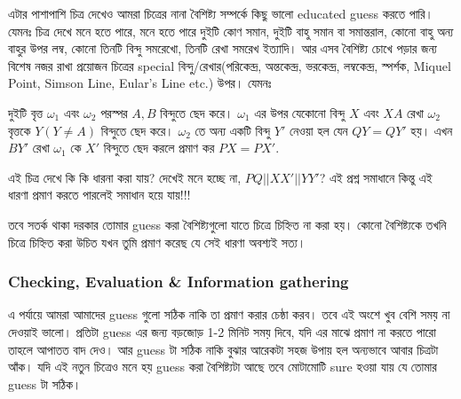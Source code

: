 \documentclass[a4paper,11pt]{article}
\begin{document}
এটার পাশাপাশি চিত্র দেখেও আমরা চিত্রের নানা বৈশিষ্ট্য সম্পর্কে কিছু ভালো educated guess করতে পারি। যেমনঃ  চিত্র দেখে মনে হতে পারে, মনে হতে পারে দুইটি কোণ সমান, দুইটি বাহু সমান বা সমান্তরাল, কোনো বাহু অন্য বাহুর উপর লম্ব, কোনো তিনটি বিন্দু সমরেখো, তিনটি রেখা সমরেখ ইত্যাদি। আর এসব বৈশিষ্ট্য চোখে পড়ার জন্য বিশেষ নজর রাখা প্রয়োজন চিত্রের special বিন্দু/রেখার(পরিকেন্দ্র, অন্তকেন্দ্র, ভরকেন্দ্র, লম্বকেন্দ্র, স্পর্শক, Miquel Point, Simson Line, Eular's Line etc.) উপর। যেমনঃ 
\begin{xmpl}
	দুইটি বৃত্ত $\omega_1$ এবং $\omega_2$ পরস্পর $A,B$ বিন্দুতে ছেদ করে। $\omega_1$ এর উপর যেকোনো বিন্দু $X$ এবং $XA$ রেখা $\omega_2$ বৃত্তকে $Y(Y\neq A)$ বিন্দুতে ছেদ করে। $\omega_2$ তে অন্য একটি বিন্দু $Y'$ নেওয়া হল যেন $QY=QY'$ হয়। এখন $BY'$ রেখা $\omega_1$ কে $X'$ বিন্দুতে ছেদ করলে প্রমাণ কর $PX=PX'$.
\end{xmpl}
\begin{center}
\end{center}
এই চিত্র দেখে কি কি ধারনা করা যায়? দেখেই মনে হচ্ছে না, $PQ||XX'||YY'$? এই প্রশ্ন সমাধানে কিন্তু এই ধারণা প্রমাণ করতে পারলেই সমাধান হয়ে যায়!!! 

তবে সতর্ক থাকা দরকার তোমার guess করা বৈশিষ্ট্যগুলো যাতে চিত্রে চিহ্নিত না করা হয়। কোনো বৈশিষ্ট্যকে তখনি চিত্রে চিহ্নিত করা উচিত যখন তুমি প্রমাণ করেছ যে সেই ধারণা অবশ্যই সত্য। 

\subsubsection{Checking, Evaluation \& Information gathering}
এ পর্যায়ে আমরা আমাদের guess গুলো সঠিক নাকি তা প্রমাণ করার চেষ্ঠা করব। তবে এই অংশে খুব বেশি সময় না দেওয়াই ভালো। প্রতিটা guess এর জন্য বড়জোড় 1-2 মিনিট সময় দিবে, যদি এর মাঝে প্রমাণ না করতে পারো তাহলে আপাতত বাদ দেও। আর guess টা সঠিক নাকি বুঝার আরেকটা সহজ উপায় হল অন্যভাবে আবার চিত্রটা আঁক। যদি এই নতুন চিত্রেও মনে হয় guess করা বৈশিষ্ট্যটা আছে তবে মোটামোটি sure হওয়া যায় যে তোমার guess টা সঠিক। 
\end{document}
